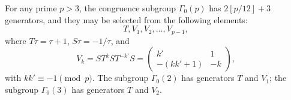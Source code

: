 For any prime $p > 3$, the congruence subgroup $\Gamma_0(p)$ has $2[p/12] + 3$ generators, and they may be selected from the following elements:
$$T, V_1, V_2, \ldots, V_{p-1},$$
where $T\tau = \tau + 1$, $S\tau = -1/\tau$, and
$$V_k = ST^kST^{-k'}S = \begin{pmatrix} k' & 1 \\ -(kk' + 1) & -k \end{pmatrix},$$
with $kk' \equiv -1 \pmod{p}$. The subgroup $\Gamma_0(2)$ has generators $T$ and $V_1$; the subgroup $\Gamma_0(3)$ has generators $T$ and $V_2$.
